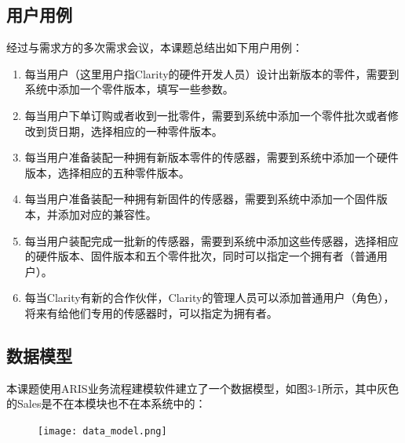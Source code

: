 \subsection{用户用例}
经过与需求方的多次需求会议，本课题总结出如下用户用例：
\begin{enumerate}
  \item 每当用户（这里用户指Clarity的硬件开发人员）设计出新版本的零件，需要到系统中添加一个零件版本，填写一些参数。
  \item 每当用户下单订购或者收到一批零件，需要到系统中添加一个零件批次或者修改到货日期，选择相应的一种零件版本。
  \item 每当用户准备装配一种拥有新版本零件的传感器，需要到系统中添加一个硬件版本，选择相应的五种零件版本。
  \item 每当用户准备装配一种拥有新固件的传感器，需要到系统中添加一个固件版本，并添加对应的兼容性。
  \item 每当用户装配完成一批新的传感器，需要到系统中添加这些传感器，选择相应的硬件版本、固件版本和五个零件批次，同时可以指定一个拥有者（普通用户）。
  \item 每当Clarity有新的合作伙伴，Clarity的管理人员可以添加普通用户（角色），将来有给他们专用的传感器时，可以指定为拥有者。
\end{enumerate}
\subsection{数据模型}
本课题使用ARIS业务流程建模软件建立了一个数据模型，如图3-1所示，其中灰色的Sales是不在本模块也不在本系统中的：
\begin{figure}[!htp]
 \centering
 \texttt{[image: data\_model.png]}
\end{figure}

